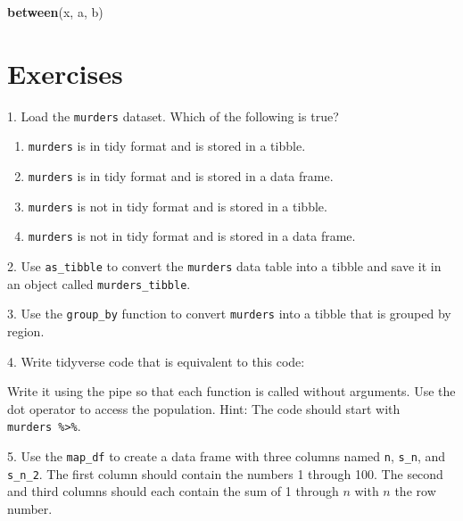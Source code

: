 \documentclass[
]{krantz}
\newenvironment{Shaded}{\begin{snugshade}}{\end{snugshade}}
\newcommand{\KeywordTok}[1]{\textcolor[rgb]{0.27,0.27,0.27}{\textbf{#1}}}
\newcommand{\NormalTok}[1]{#1}
\newcommand{\OperatorTok}[1]{\textcolor[rgb]{0.43,0.43,0.43}{\textbf{#1}}}
\providecommand{\tightlist}{%
  \setlength{\itemsep}{0pt}\setlength{\parskip}{0pt}}
\begin{document}
\begin{Shaded}
\begin{Highlighting}[]
\KeywordTok{between}\NormalTok{(x, a, b)}
\end{Highlighting}
\end{Shaded}

\hypertarget{exercises-12}{%
\section{Exercises}\label{exercises-12}}

1. Load the \texttt{murders} dataset. Which of the following is true?

\begin{enumerate}
\def\labelenumi{\alph{enumi}.}
\tightlist
\item
  \texttt{murders} is in tidy format and is stored in a tibble.
\item
  \texttt{murders} is in tidy format and is stored in a data frame.
\item
  \texttt{murders} is not in tidy format and is stored in a tibble.
\item
  \texttt{murders} is not in tidy format and is stored in a data frame.
\end{enumerate}

2. Use \texttt{as\_tibble} to convert the \texttt{murders} data table into a tibble and save it in an object called \texttt{murders\_tibble}.

3. Use the \texttt{group\_by} function to convert \texttt{murders} into a tibble that is grouped by region.

4. Write tidyverse code that is equivalent to this code:

\begin{Shaded}
\end{Shaded}

Write it using the pipe so that each function is called without arguments. Use the dot operator to access the population. Hint: The code should start with \texttt{murders\ \%\textgreater{}\%}.

5. Use the \texttt{map\_df} to create a data frame with three columns named \texttt{n}, \texttt{s\_n}, and \texttt{s\_n\_2}. The first column should contain the numbers 1 through 100. The second and third columns should each contain the sum of 1 through \(n\) with \(n\) the row number.
\end{document}

